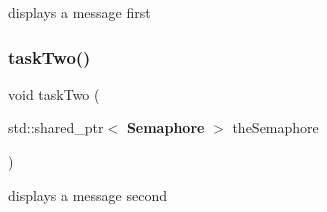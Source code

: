 displays a message first \mbox{\label{signal_8cpp_ae4ea9570be601d182fa473c7ca431852}} 
\subsubsection{task\+Two()}
{\footnotesize\ttfamily void task\+Two (\begin{DoxyParamCaption}\item[{std\+::shared\+\_\+ptr$<$ \textbf{ Semaphore} $>$}]{the\+Semaphore }\end{DoxyParamCaption})}

displays a message second 